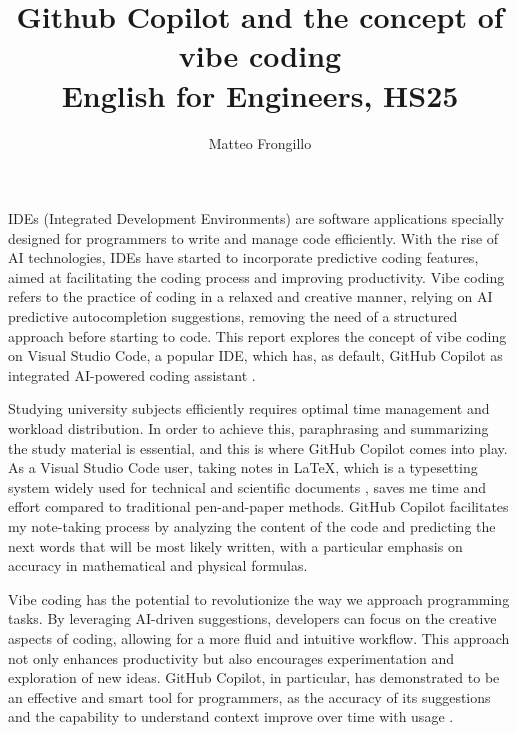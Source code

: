 \documentclass{article}
\title{\textbf{Github Copilot and the concept of vibe coding \\ English for Engineers, HS25}}
\author{Matteo Frongillo}
\date{}
\begin{document}
\hypersetup{citecolor=black}
\maketitle
\linespread{1.2}\selectfont

IDEs (Integrated Development Environments) are software applications specially designed
for programmers to write and manage code efficiently. With the rise of AI technologies,
IDEs have started to incorporate predictive coding features, aimed at facilitating the
coding process and improving productivity. Vibe coding refers to the practice of
coding in a relaxed and creative manner, relying on AI predictive autocompletion
suggestions, removing the need of a structured approach before starting to code.
This report explores the concept of vibe coding on Visual Studio Code, a popular IDE,
which has, as default, GitHub Copilot as integrated AI-powered coding assistant \parencite{vscode-overview}.
\vspace*{.25cm}

Studying university subjects efficiently requires optimal time management and workload
distribution. In order to achieve this, paraphrasing and summarizing the study material is
essential, and this is where GitHub Copilot comes into play. As a Visual Studio Code
user, taking notes in LaTeX, which is a typesetting system widely used for technical and
scientific documents \parencite{latex}, saves me time and effort compared to traditional
pen-and-paper methods. GitHub Copilot facilitates my note-taking process by analyzing the
content of the code and predicting the next words that will be most likely written,
with a particular emphasis on accuracy in mathematical and physical formulas.
\vspace*{.25cm}

Vibe coding has the potential to revolutionize the way we approach programming tasks.
By leveraging AI-driven suggestions, developers can focus on the creative aspects of coding,
allowing for a more fluid and intuitive workflow. This approach not only enhances
productivity but also encourages experimentation and exploration of new ideas.
GitHub Copilot, in particular, has demonstrated to be an effective and smart tool for
programmers, as the accuracy of its suggestions and the capability to understand context
improve over time with usage \parencite{vscode-inline}.
\vspace*{.25cm}
\end{document}
